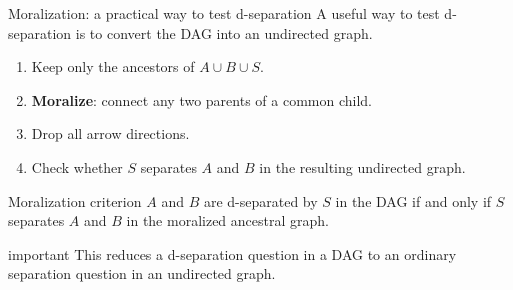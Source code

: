 \documentclass[dvipsnames,aspectratio=169,handout]{beamer}
\begin{document}
\begin{frame}{Moralization: a practical way to test d-separation}
A useful way to test d-separation is to convert the DAG into an undirected graph.

\begin{enumerate}
    \item Keep only the ancestors of $A\cup B\cup S$.
    \item \textbf{Moralize}: connect any two parents of a common child.
    \item Drop all arrow directions.
    \item Check whether $S$ separates $A$ and $B$ in the resulting undirected graph.
\end{enumerate}

\begin{alertblock}{Moralization criterion}
$A$ and $B$ are d-separated by $S$ in the DAG
if and only if $S$ separates $A$ and $B$ in the moralized ancestral graph.
\end{alertblock}

\begin{beamercolorbox}[wd=\textwidth,sep=7pt,center,rounded=true,shadow=true]{important}
This reduces a d-separation question in a DAG to an ordinary separation question in an undirected graph.
\end{beamercolorbox}
\end{frame}
\end{document}
